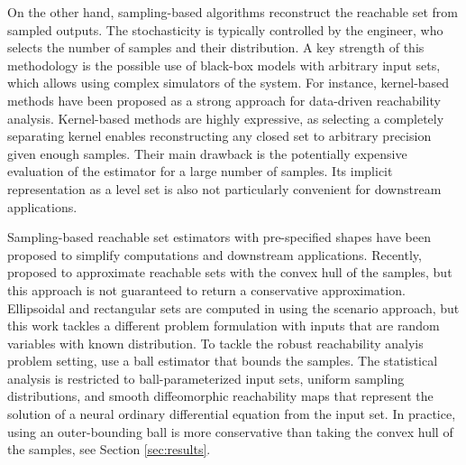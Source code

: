 \documentclass[12pt]{l4dc2022} %
\begin{document}
% 


On the other hand, sampling-based algorithms reconstruct the reachable set %
from sampled outputs. %
The stochasticity is typically controlled by the engineer, who selects the number of samples and their distribution. 
A key strength of this methodology is the possible use of black-box models %
with arbitrary input sets, %
which allows using complex simulators of the system. 
% 
% 
% 
% 
% 
For instance, kernel-based methods \citep{DeVito2014,Rudi2017,ThorpeL4DC2021} have been proposed as a strong approach for data-driven reachability analysis. Kernel-based methods are highly expressive, as selecting a completely separating kernel \citep{DeVito2014} enables reconstructing any closed set %
to arbitrary precision given enough samples. 
% 
% 
Their main drawback %
is the potentially expensive evaluation of %
the estimator for a large number of samples. %
Its implicit representation %
as a level set is also not particularly convenient for downstream applications. %
% 
% 
% 
% 
% 
% 
% 



Sampling-based reachable set estimators with pre-specified shapes have been proposed to simplify computations and downstream applications. 
% 
% 
% 
Recently, \citep{LewPavone2020} proposed to approximate %
reachable sets %
with the convex hull of the samples,  
but this approach is not guaranteed to return a conservative approximation. %
% 
% 
% 
% 
% 
Ellipsoidal and rectangular sets are computed in \citep{DevonportL4DC2020} using the scenario approach, but this work tackles a different problem formulation with inputs that are random variables with known distribution.  
% 
% 
% 
% 
% 
% 
To tackle the robust reachability analyis problem setting, %
\citep{Gruenbacher2021} use a ball estimator %
that bounds the samples. %
The statistical analysis is restricted to ball-parameterized input sets, %
uniform sampling distributions, and smooth diffeomorphic reachability maps %
that represent the solution of a neural ordinary differential equation \citep{Chen2018} from the input set. %
In practice, using an outer-bounding ball %
is more conservative than taking the convex hull of the samples, see %
Section \ref{sec:results}. 
 
 
% 
% 
% 
 
 
 
 
 
 



% 
% 
% 
% 
% 
% 
% 
% 
% 
% 
% 
% 
\end{document}
